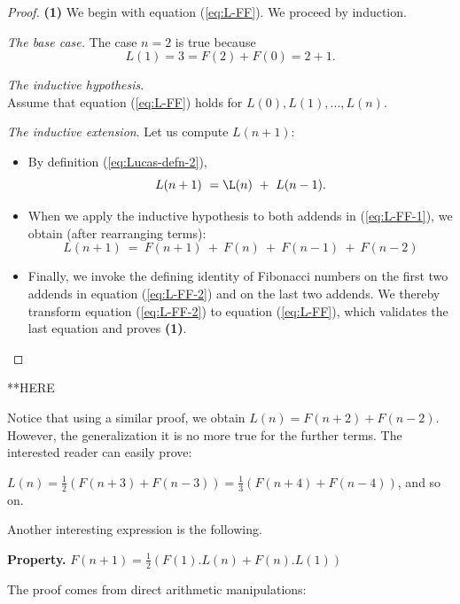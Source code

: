 \begin{proof}
{\bf (1)}
We begin with equation (\ref{eq:L-FF}).  We proceed by induction.

\medskip

\noindent
{\it The base case.}
The case $n=2$ is true because
\[ L(1) = 3 = F(2) + F(0) = 2+1. \]

\medskip

\noindent
{\it The inductive hypothesis}. \\
Assume that equation (\ref{eq:L-FF}) holds for $L(0), L(1), \ldots,
L(n)$.

\medskip

\noindent
{\it The inductive extension}. 
Let us compute $L(n+1)$:
\begin{itemize}
\item
By definition (\ref{eq:Lucas-defn-2}),
\begin{equation}
\label{eq:L-FF-1}
L(n+1) \ = \L(n) \ + \ L(n-1).
\end{equation}
\item
When we apply the inductive hypothesis to both addends in
(\ref{eq:L-FF-1}), we obtain (after rearranging terms):
\begin{equation}
\label{eq:L-FF-2}
L(n+1) \ = \  F(n+1) \ + \ F(n) \ + \ F(n-1) \ + \ F(n-2)
\end{equation}
\item
Finally, we invoke the defining
identity of Fibonacci numbers on the first two addends in
equation (\ref{eq:L-FF-2}) and on the last two addends.  We thereby
transform equation (\ref{eq:L-FF-2}) to equation (\ref{eq:L-FF}),
which validates the last equation and proves {\bf (1)}.
\end{itemize}
\end{proof}
\bigskip

**HERE

\medskip

Notice that using a similar proof, we obtain $L(n) = F(n+2)+F(n-2)$. 
However, the generalization it is no more true for the further terms.
The interested reader can easily prove:

$L(n) = \frac{1}{2} (F(n+3)+F(n-3))= \frac{1}{3} (F(n+4)+F(n-4))$, and so on.
\medskip

Another interesting expression is the following.

\noindent \textbf{Property. } 
\label{prop:Lucas2}
$F(n+1) = \frac{1}{2} (F(1).L(n) + F(n).L(1))$


\medskip
The proof comes from direct arithmetic manipulations:

